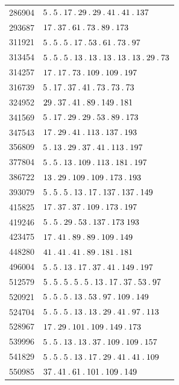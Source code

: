 \begin{longtable}{@{}r|l@{}}
286904 & $5\pdot 5\pdot 17\pdot 29\pdot 29\pdot 41\pdot 41\pdot 137$\\
293687 & $17\pdot 37\pdot 61\pdot 73\pdot 89\pdot 173$\\
311921 & $5\pdot 5\pdot 5\pdot 17\pdot 53\pdot 61\pdot 73\pdot 97$\\
313454 & $5\pdot 5\pdot 5\pdot 13\pdot 13\pdot 13\pdot 13\pdot 13\pdot 29\pdot 73$\\
314257 & $17\pdot 17\pdot 73\pdot 109\pdot 109\pdot 197$\\
316739 & $5\pdot 17\pdot 37\pdot 41\pdot 73\pdot 73\pdot 73$\\
324952 & $29\pdot 37\pdot 41\pdot 89\pdot 149\pdot 181$\\
341569 & $5\pdot 17\pdot 29\pdot 29\pdot 53\pdot 89\pdot 173$\\
347543 & $17\pdot 29\pdot 41\pdot 113\pdot 137\pdot 193$\\
356809 & $5\pdot 13\pdot 29\pdot 37\pdot 41\pdot 113\pdot 197$\\
377804 & $5\pdot 5\pdot 13\pdot 109\pdot 113\pdot 181\pdot 197$\\
386722 & $13\pdot 29\pdot 109\pdot 109\pdot 173\pdot 193$\\
393079 & $5\pdot 5\pdot 5\pdot 13\pdot 17\pdot 137\pdot 137\pdot 149$\\
415825 & $17\pdot 37\pdot 37\pdot 109\pdot 173\pdot 197$\\
419246 & $5\pdot 5\pdot 29\pdot 53\pdot 137\pdot 173\;193$\\
423475 & $17\pdot 41\pdot 89\pdot 89\pdot 109\pdot 149$\\
448280 & $41\pdot 41\pdot 41\pdot 89\pdot 181\pdot 181$\\
496004 & $5\pdot 5\pdot 13\pdot 17\pdot 37\pdot 41\pdot 149\pdot 197$\\
512579 & $5\pdot 5\pdot 5\pdot 5\pdot 5\pdot 13\pdot 17\pdot 37\pdot 53\pdot 97$\\
520921 & $5\pdot 5\pdot 5\pdot 13\pdot 53\pdot 97\pdot 109\pdot 149$\\
524704 & $5\pdot 5\pdot 5\pdot 13\pdot 13\pdot 29\pdot 41\pdot 97\pdot 113$\\
528967 & $17\pdot 29\pdot 101\pdot 109\pdot 149\pdot 173$\\
539996 & $5\pdot 5\pdot 13\pdot 13\pdot 37\pdot 109\pdot 109\pdot 157$\\
541829 & $5\pdot 5\pdot 5\pdot 13\pdot 17\pdot 29\pdot 41\pdot 41\pdot 109$\\
550985 & $37\pdot 41\pdot 61\pdot 101\pdot 109\pdot 149$\\

\end{longtable}
